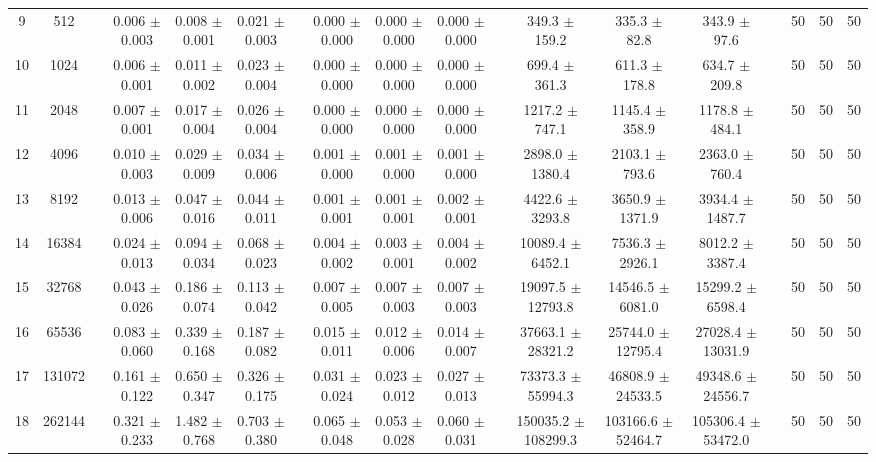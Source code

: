 \documentclass[11pt]{article}
\begin{document}
\begin{landscape}
\begin{table}
\begin{tabular}{cccccccccccccccccc}
 9 &     512 &&  0.006 $\pm$ 0.003 & 0.008 $\pm$ 0.001 & 0.021 $\pm$ 0.003 &&  0.000 $\pm$ 0.000 & 0.000 $\pm$ 0.000 & 0.000 $\pm$ 0.000 &&  349.3 $\pm$ 159.2 & 335.3 $\pm$ 82.8 & 343.9 $\pm$ 97.6 && 50& 50& 50\\
10 &    1024 &&  0.006 $\pm$ 0.001 & 0.011 $\pm$ 0.002 & 0.023 $\pm$ 0.004 &&  0.000 $\pm$ 0.000 & 0.000 $\pm$ 0.000 & 0.000 $\pm$ 0.000 &&  699.4 $\pm$ 361.3 & 611.3 $\pm$ 178.8 & 634.7 $\pm$ 209.8 && 50& 50& 50\\
11 &    2048 &&  0.007 $\pm$ 0.001 & 0.017 $\pm$ 0.004 & 0.026 $\pm$ 0.004 &&  0.000 $\pm$ 0.000 & 0.000 $\pm$ 0.000 & 0.000 $\pm$ 0.000 &&  1217.2 $\pm$ 747.1 & 1145.4 $\pm$ 358.9 & 1178.8 $\pm$ 484.1 && 50& 50& 50\\
12 &    4096 &&  0.010 $\pm$ 0.003 & 0.029 $\pm$ 0.009 & 0.034 $\pm$ 0.006 &&  0.001 $\pm$ 0.000 & 0.001 $\pm$ 0.000 & 0.001 $\pm$ 0.000 &&  2898.0 $\pm$ 1380.4 & 2103.1 $\pm$ 793.6 & 2363.0 $\pm$ 760.4 && 50& 50& 50\\
13 &    8192 &&  0.013 $\pm$ 0.006 & 0.047 $\pm$ 0.016 & 0.044 $\pm$ 0.011 &&  0.001 $\pm$ 0.001 & 0.001 $\pm$ 0.001 & 0.002 $\pm$ 0.001 &&  4422.6 $\pm$ 3293.8 & 3650.9 $\pm$ 1371.9 & 3934.4 $\pm$ 1487.7 && 50& 50& 50\\
14 &   16384 &&  0.024 $\pm$ 0.013 & 0.094 $\pm$ 0.034 & 0.068 $\pm$ 0.023 &&  0.004 $\pm$ 0.002 & 0.003 $\pm$ 0.001 & 0.004 $\pm$ 0.002 &&  10089.4 $\pm$ 6452.1 & 7536.3 $\pm$ 2926.1 & 8012.2 $\pm$ 3387.4 && 50& 50& 50\\
15 &   32768 &&  0.043 $\pm$ 0.026 & 0.186 $\pm$ 0.074 & 0.113 $\pm$ 0.042 &&  0.007 $\pm$ 0.005 & 0.007 $\pm$ 0.003 & 0.007 $\pm$ 0.003 &&  19097.5 $\pm$ 12793.8 & 14546.5 $\pm$ 6081.0 & 15299.2 $\pm$ 6598.4 && 50& 50& 50\\
16 &   65536 &&  0.083 $\pm$ 0.060 & 0.339 $\pm$ 0.168 & 0.187 $\pm$ 0.082 &&  0.015 $\pm$ 0.011 & 0.012 $\pm$ 0.006 & 0.014 $\pm$ 0.007 &&  37663.1 $\pm$ 28321.2 & 25744.0 $\pm$ 12795.4 & 27028.4 $\pm$ 13031.9 && 50& 50& 50\\
17 &  131072 &&  0.161 $\pm$ 0.122 & 0.650 $\pm$ 0.347 & 0.326 $\pm$ 0.175 &&  0.031 $\pm$ 0.024 & 0.023 $\pm$ 0.012 & 0.027 $\pm$ 0.013 &&  73373.3 $\pm$ 55994.3 & 46808.9 $\pm$ 24533.5 & 49348.6 $\pm$ 24556.7 && 50& 50& 50\\
18 &  262144 &&  0.321 $\pm$ 0.233 & 1.482 $\pm$ 0.768 & 0.703 $\pm$ 0.380 &&  0.065 $\pm$ 0.048 & 0.053 $\pm$ 0.028 & 0.060 $\pm$ 0.031 &&  150035.2 $\pm$ 108299.3 & 103166.6 $\pm$ 52464.7 & 105306.4 $\pm$ 53472.0 && 50& 50& 50\\

\end{tabular}
\end{table}
\end{landscape}
\end{document}
